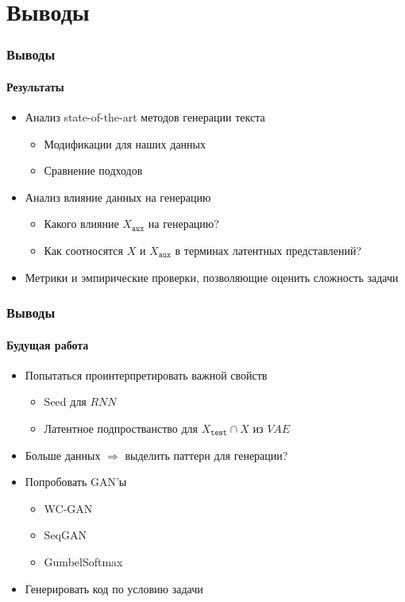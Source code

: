 \documentclass[10pt]{beamer}
\newcommand\TODO[1]{\textcolor{red}{{\Large TODO: #1}}}
\begin{document}
\section{Выводы}
\begin{frame}
\frametitle{Выводы}
\framesubtitle{Результаты}

\begin{itemize}
    \item Анализ state-of-the-art методов генерации текста
        \begin{itemize}
            \item Модификации для наших данных
            \item Сравнение подходов
        \end{itemize}
    \item Анализ влияние данных на генерацию
    \begin{itemize}
        \item Какого влияние $X_{\texttt{aux}}$ на генерацию?
        \item Как соотносятся $X$ и $X_{\texttt{aux}}$ в терминах латентных представлений?
    \end{itemize}
    \item Метрики и эмпирические проверки, позволяющие оценить сложность задачи
\end{itemize}


\end{frame}
\begin{frame}
\frametitle{Выводы}
\framesubtitle{Будущая работа}

\begin{itemize}
    \item Попытаться проинтерпретировать важной свойств
    \begin{itemize}
        \item Seed для $RNN$
        \item Латентное подпростванство для $X_{\texttt{test}} \cap X$ из $VAE$
    \end{itemize}
    \item Больше данных $\Rightarrow$ выделить паттерн для генерации?
    \item Попробовать GAN'ы
        \begin{itemize}
            \item WC-GAN
            \item SeqGAN
            \item GumbelSoftmax
        \end{itemize}
    \item Генерировать код по условию задачи
\end{itemize}


\end{frame}
\end{document}
